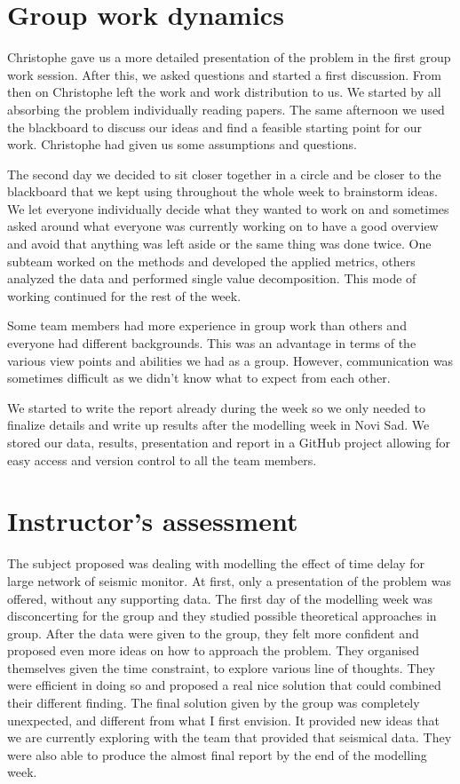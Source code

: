 \documentclass[12pt, sumlimits, intlimits]{article}
\begin{document}

\section{Group work dynamics}

Christophe gave us a more detailed presentation of the problem in the first group work session. After this, we asked questions and started a first discussion. From then on Christophe left the work and work distribution to us. We started by all absorbing the problem individually reading papers. The same afternoon we used the blackboard to discuss our ideas and find a feasible starting point for our work. Christophe had given us some assumptions and questions. 

The second day we decided to sit closer together in a circle and be closer to the blackboard that we kept using throughout the whole week to brainstorm ideas. 
We let everyone individually decide what they wanted to work on and sometimes asked around what everyone was currently working on to have a good overview and avoid that anything was left aside or the same thing was done twice. One subteam worked on the methods and developed the applied metrics, others analyzed the data and performed single value decomposition. This mode of working continued for the rest of the week. 

Some team members had more experience in group work than others and everyone had different backgrounds. This was an advantage in terms of the various view points and abilities we had as a group. However, communication was sometimes difficult as we didn't know what to expect from each other.

We started to write the report already during the week so we only needed to finalize details and write up results after the modelling week in Novi Sad. We stored our data, results, presentation and report in a GitHub project allowing for easy access and version control to all the team members. 

\section{Instructor's assessment}

The subject proposed was dealing with modelling the effect of time delay for large network of seismic monitor. At first, only a presentation of the problem was offered, without any supporting data. The first day of the modelling week was disconcerting for the group and they studied possible theoretical approaches in group.
After the data were given to the group, they felt more confident and proposed even more ideas on how to approach the problem. They organised themselves given the time constraint, to explore various line of thoughts. They were efficient in doing so and proposed a real nice solution that could combined their different finding.
The final solution given by the group was completely unexpected, and different from what I first envision. It provided new ideas that we are currently exploring with the team that provided that seismical data.
They were also able to produce the almost final report by the end of the modelling week.
\end{document}
